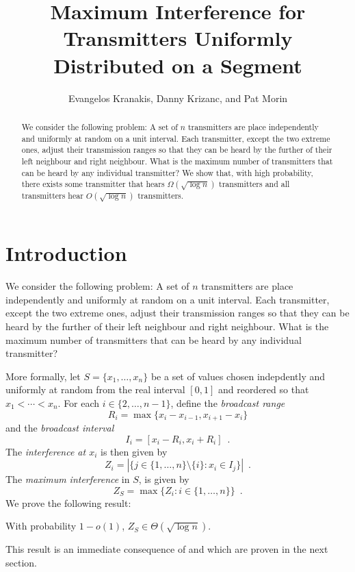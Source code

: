 \documentclass{patmorin}
\title{Maximum Interference for Transmitters Uniformly Distributed on a Segment}
\author{Evangelos Kranakis, Danny Krizanc, and Pat Morin}
\begin{document}
\maketitle

\begin{abstract}
We consider the following problem: A set of $n$ transmitters are
place independently and uniformly at random on a unit interval.  Each
transmitter, except the two extreme ones, adjust their transmission ranges
so that they can be heard by the further of their left neighbour and right
neighbour.  What is the maximum number of transmitters that can be heard
by any individual transmitter?  We show that, with high probability,
there exists some transmitter that hears $\Omega(\sqrt{\log n})$
transmitters and all transmitters hear $O(\sqrt{\log n})$ transmitters.
\end{abstract}

\section{Introduction}

We consider the following problem: A set of $n$ transmitters are
place independently and uniformly at random on a unit interval.  Each
transmitter, except the two extreme ones, adjust their transmission ranges
so that they can be heard by the further of their left neighbour and right
neighbour.  What is the maximum number of transmitters that can be heard
by any individual transmitter? 

More formally, let $S=\{x_1,\ldots,x_n\}$ be a set of values chosen
indepdently and uniformly at random from the real interval $[0,1]$
and reordered so that $x_1<\cdots<x_n$.  For each
$i\in\{2,\ldots,n-1\}$, define the \emph{broadcast range} 
\[
   R_i = \max\{x_i - x_{i-1}, x_{i+1}-x_i\}
\]
and the \emph{broadcast interval}
\[
   I_i = [x_i-R_i,x_i+R_i] \enspace .
\]
The \emph{interference at $x_i$} is then given by
\[
   Z_i = |\{j\in\{1,\ldots,n\}\setminus\{i\} : x_i \in I_j\}| \enspace .
\]
The \emph{maximum interference} in $S$, is given by
\[
   Z_S=\max\{Z_i:i\in\{1,\ldots,n\}\} \enspace .
\]
We prove the following result:

\begin{thm}
With probability $1-o(1)$, $Z_S\in \Theta(\sqrt{\log n})$.
\end{thm}

This result is an immediate consequence of  and
 which are proven in the next section.
\end{document}
